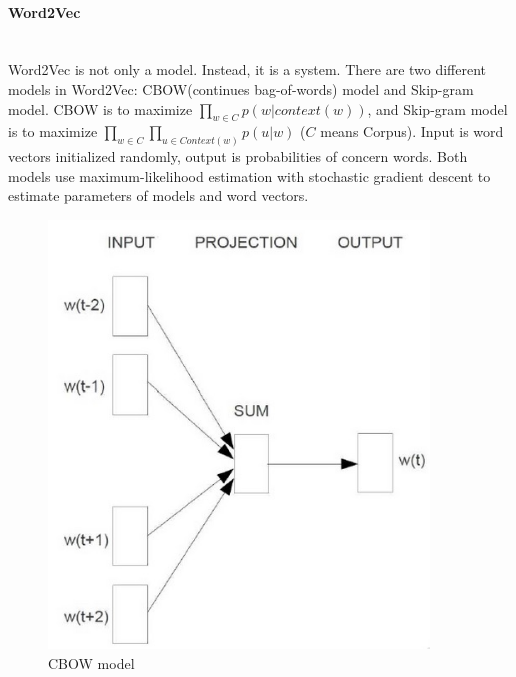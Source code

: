 \documentclass{scrartcl}
\begin{document}
\paragraph{Word2Vec}
\hfill \\
Word2Vec is not only a model. Instead, it is a system. There are two different models in Word2Vec: CBOW(continues bag-of-words) model and Skip-gram model. CBOW is to maximize $\prod_{w\in\textit{C}} p(w|context(w))$, and
Skip-gram model is to maximize $\prod_{w\in\textit{C}} \prod_{u\in Context(w)} p(u|w) $ ($\textit{C}$ means Corpus). Input is word vectors initialized randomly, output is probabilities of concern words. Both models use maximum-likelihood estimation with stochastic gradient descent to estimate parameters of models and word vectors.
\begin{figure}[H]
\centering
\begin{minipage}{.5\textwidth}
 
	\includegraphics[width=0.9\textwidth]{CBOW} 
	\caption{CBOW model}
	\label{fig:CBOW}
\end{minipage}%
\begin{minipage}{.5\textwidth}
  

\end{minipage}
\end{figure}
\end{document}
